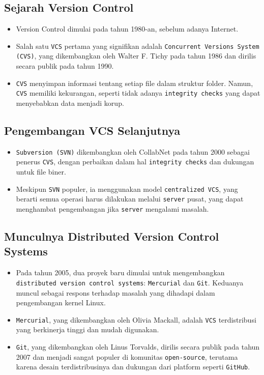\documentclass{article}
\begin{document}
\subsection{Sejarah Version Control}
\begin{itemize}
    \item Version Control dimulai pada tahun 1980-an, sebelum adanya Internet.
    \item Salah satu \texttt{VCS} pertama yang signifikan adalah \texttt{Concurrent Versions System (CVS)}, yang dikembangkan oleh Walter F. Tichy pada tahun 1986 dan dirilis secara publik pada tahun 1990.
    \item \texttt{CVS} menyimpan informasi tentang setiap file dalam struktur folder. Namun, \texttt{CVS} memiliki kekurangan, seperti tidak adanya \texttt{integrity checks} yang dapat menyebabkan data menjadi korup.
\end{itemize}

\subsection{Pengembangan VCS Selanjutnya}
\begin{itemize}
    \item \texttt{Subversion (SVN)} dikembangkan oleh CollabNet pada tahun 2000 sebagai penerus \texttt{CVS}, dengan perbaikan dalam hal \texttt{integrity checks} dan dukungan untuk file biner.
    \item Meskipun \texttt{SVN} populer, ia menggunakan model \texttt{centralized VCS}, yang berarti semua operasi harus dilakukan melalui \texttt{server} pusat, yang dapat menghambat pengembangan jika \texttt{server} mengalami masalah.
\end{itemize}

\subsection{Munculnya Distributed Version Control Systems}
\begin{itemize}
    \item Pada tahun 2005, dua proyek baru dimulai untuk mengembangkan \texttt{distributed version control systems}: \texttt{Mercurial} dan \texttt{Git}. Keduanya muncul sebagai respons terhadap masalah yang dihadapi dalam pengembangan kernel Linux.
    \item \texttt{Mercurial}, yang dikembangkan oleh Olivia Mackall, adalah \texttt{VCS} terdistribusi yang berkinerja tinggi dan mudah digunakan.
    \item \texttt{Git}, yang dikembangkan oleh Linus Torvalds, dirilis secara publik pada tahun 2007 dan menjadi sangat populer di komunitas \texttt{open-source}, terutama karena desain terdistribusinya dan dukungan dari platform seperti \texttt{GitHub}.
\end{itemize}
\end{document}
